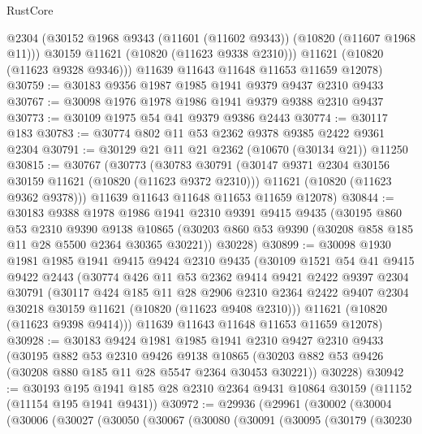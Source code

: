 \begin{lexlean}{RustCore}
\begin{coremodule}
          @2304
          (@30152 @1968 @9343 (@11601 (@11602 @9343)) (@10820 (@11607 @1968 @11)))
          @30159
          @11621
          (@10820 (@11623 @9338 @2310)))
        @11621
        (@10820 (@11623 @9328 @9346)))
      @11639
      @11643
      @11648
      @11653
      @11659
      @12078)
@30759 := @30183 @9356 @1987 @1985 @1941 @9379 @9437 @2310 @9433
@30767 := @30098 @1976 @1978 @1986 @1941 @9379 @9388 @2310 @9437
@30773 := @30109 @1975 @54 @41 @9379 @9386 @2443
@30774 := @30117 @183
@30783 := @30774 @802 @11 @53 @2362 @9378 @9385 @2422 @9361 @2304
@30791 := @30129 @21 @11 @21 @2362 (@10670 (@30134 @21)) @11250
@30815 := @30767
    (@30773
      (@30783
        @30791
        (@30147 @9371 @2304 @30156 @30159 @11621 (@10820 (@11623 @9372 @2310)))
        @11621
        (@10820 (@11623 @9362 @9378)))
      @11639
      @11643
      @11648
      @11653
      @11659
      @12078)
@30844 := @30183
    @9388
    @1978
    @1986
    @1941
    @2310
    @9391
    @9415
    @9435
    (@30195
      @860
      @53
      @2310
      @9390
      @9138
      @10865
      (@30203 @860 @53 @9390 (@30208 @858 @185 @11 @28 @5500 @2364 @30365 @30221))
      @30228)
@30899 := @30098
    @1930
    @1981
    @1985
    @1941
    @9415
    @9424
    @2310
    @9435
    (@30109
      @1521
      @54
      @41
      @9415
      @9422
      @2443
      (@30774
        @426
        @11
        @53
        @2362
        @9414
        @9421
        @2422
        @9397
        @2304
        @30791
        (@30117
          @424
          @185
          @11
          @28
          @2906
          @2310
          @2364
          @2422
          @9407
          @2304
          @30218
          @30159
          @11621
          (@10820 (@11623 @9408 @2310)))
        @11621
        (@10820 (@11623 @9398 @9414)))
      @11639
      @11643
      @11648
      @11653
      @11659
      @12078)
@30928 := @30183
    @9424
    @1981
    @1985
    @1941
    @2310
    @9427
    @2310
    @9433
    (@30195
      @882
      @53
      @2310
      @9426
      @9138
      @10865
      (@30203 @882 @53 @9426 (@30208 @880 @185 @11 @28 @5547 @2364 @30453 @30221))
      @30228)
@30942 := @30193
    @195
    @1941
    @185
    @28
    @2310
    @2364
    @9431
    @10864
    @30159
    (@11152 (@11154 @195 @1941 @9431))
@30972 := @29936
    (@29961
      (@30002
        (@30004
          (@30006
            (@30027
              (@30050
                (@30067
                  (@30080
                    (@30091
                      (@30095
                        (@30179
                          (@30230

\end{coremodule}
\end{lexlean}
